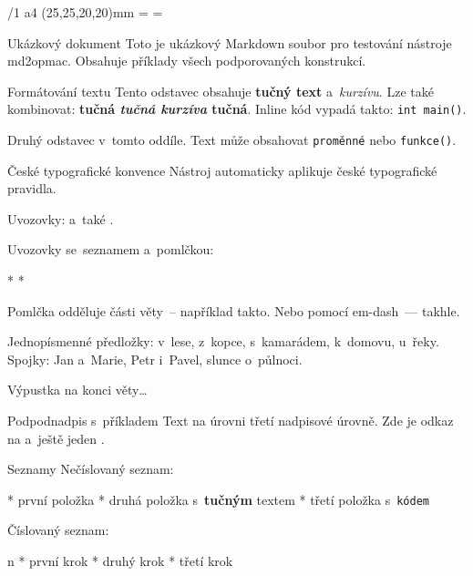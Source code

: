 \fontfam[LM]
\def\begcitation{\par\medskip\leftskip=2em\rightskip=2em\noindent}
\def\endcitation{\par\leftskip=0em\rightskip=0em\medskip}
\fontfam[Heros]
\typosize[10/13]
\margins/1 a4 (25,25,20,20)mm
\footline={\hss\folio\hss}
\everytt={\typosize[9/11]\relax}



\chap Ukázkový dokument
Toto je ukázkový Markdown soubor pro testování nástroje md2opmac.
Obsahuje příklady všech podporovaných konstrukcí.


\sec Formátování textu
Tento odstavec obsahuje {\bf tučný text} a~{\it kurzívu}. Lze také kombinovat:
{\bf tučná {\it tučná kurzíva} tučná}. Inline kód vypadá takto: {\tt int main()}.

Druhý odstavec v~tomto oddíle. Text může obsahovat {\tt proměnné} nebo {\tt funkce()}.


\sec České typografické konvence
Nástroj automaticky aplikuje české typografické pravidla.

Uvozovky:  a~také .

Uvozovky se~seznamem a~pomlčkou:

\begitems
* 
* 
\enditems

Pomlčka odděluje části věty~-- například takto. Nebo pomocí em-dash~--- takhle.

Jednopísmenné předložky: v~lese, z~kopce, s~kamarádem, k~domovu, u~řeky.
Spojky: Jan a~Marie, Petr i~Pavel, slunce o~půlnoci.

Výpustka na konci věty\dots{}


\secc Podpodnadpis s~příkladem
Text na úrovni třetí nadpisové úrovně. Zde je odkaz na
 a~ještě jeden
.


\sec Seznamy
Nečíslovaný seznam:

\begitems
* první položka
* druhá položka s~{\bf tučným} textem
* třetí položka s~{\tt kódem}
\enditems

Číslovaný seznam:

\begitems \style n
* první krok
* druhý krok
* třetí krok
\enditems


